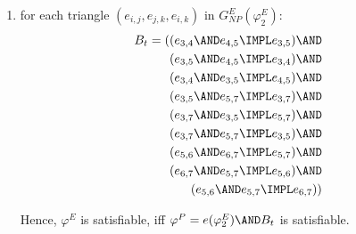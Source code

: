{\begin{enumerate}
\begin{enumerate}
\item for each triangle $(e_{i,j},e_{j,k},e_{i,k})$ in $G_{NP}^{E}(\varphi
_{2}^{E})$:%
\begin{eqnarray*}
B_{t}=((e_{3,4}\AND e_{4,5}\IMPL e_{3,5})\AND && \\
(e_{3,5}\AND e_{4,5}\IMPL e_{3,4})\AND && \\
(e_{3,4}\AND e_{3,5}\IMPL e_{4,5})\AND && \\
(e_{3,5}\AND e_{5,7}\IMPL e_{3,7})\AND && \\
(e_{3,7}\AND e_{3,5}\IMPL e_{5,7})\AND && \\
(e_{3,7}\AND e_{5,7}\IMPL e_{3,5})\AND && \\
(e_{5,6}\AND e_{6,7}\IMPL e_{5,7})\AND && \\
(e_{6,7}\AND e_{5,7}\IMPL e_{5,6})\AND && \\
(e_{5,6}\AND e_{5,7}\IMPL e_{6,7})) &&
\end{eqnarray*}

Hence, $\varphi ^{E}$ is satisfiable, iff $\varphi ^{P}=e(\varphi _{2}^{E})%
\AND B_{t}$ is satisfiable.
\end{enumerate}
\end{enumerate}


  }